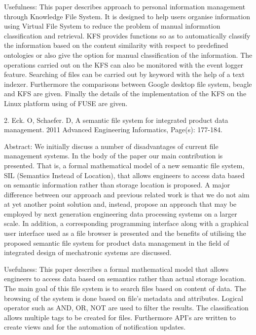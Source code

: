 Usefulness: This paper describes approach to personal information management
		through Knowledge File System. It is designed to help users organise information
		using Virtual File System to reduce the problem of manual information classification and
		retrieval. KFS provides functions so as to automatically classify the information based
		on the content similarity with respect to predefined ontologies or also give the option
		for manual classification of the information. The operations carried out on the KFS can
		also be monitored with the event logger feature. Searching of files can be carried out by
		keyword with the help of a text indexer. Furthermore the comparisons between Google
		desktop file system, beagle and KFS are given. Finally the details of the implementation
		of the KFS on the Linux platform using of FUSE are given.
		
		2. Eck. O, Schaefer. D, A semantic file system for integrated product data management.
		2011 Advanced Engineering Informatics, Page(s): 177-184.\cite{SMFS2011}
		
		Abstract: We initially discuss a number of disadvantages of current file management
		systems. In the body of the paper our main contribution is presented. That is, a formal
		mathematical model of a new semantic file system, SIL (Semantics Instead of Location),
		that allows engineers to access data based on semantic information rather than storage
		location is proposed. A major difference between our approach and previous related work
		is that we do not aim at yet another point solution and, instead, propose an approach that
		may be employed by next generation engineering data processing systems on a larger
		scale. In addition, a corresponding programming interface along with a graphical user
		interface used as a file browser is presented and the benefits of utilising the proposed
		semantic file system for product data management in the field of integrated design of
		mechatronic systems are discussed.
		
		Usefulness: This paper describes a formal mathematical model that allows engineers
		to access data based on semantics rather than actual storage location. The main goal of
		this file system is to search files based on content of data. The browsing of the system is
		done based on file's metadata and attributes. Logical operator such as AND, OR, NOT
		are used to filter the results. The classification allows multiple tags to be created for files.
		Furthermore API's are written to create views and for the automation of notification
		updates.
		
